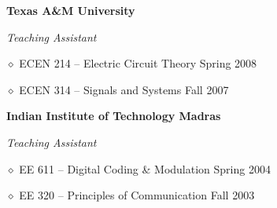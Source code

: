 \documentclass[11pt]{article}
\renewcommand{\section}[2]%
        {\pagebreak[2]\vspace{1.3\baselineskip}%
         \phantomsection\addcontentsline{toc}{section}{#1}%
         \hspace{0in}%
         \marginpar{
         \raggedright \scshape #1}#2}
\newenvironment{outerlist}[1][\enskip\textbullet]%
        {\begin{enumerate}[#1]}{\end{enumerate}%
         \vspace{-.6\baselineskip}}
\newenvironment{innerlist}[1][\enskip\textbullet]%
        {\begin{compactenum}[#1]}{\end{compactenum}}
\newcommand{\blankline}{\quad\pagebreak[2]}
\begin{document}
   \textbf{Texas A\&M University}\vspace{-.2cm}
\begin{outerlist}
\item[] \textit{Teaching Assistant}%
        \begin{innerlist}
\item[$\diamond$] {ECEN 214} -- Electric Circuit Theory  \hfill { Spring 2008}
\item[$\diamond$] {ECEN 314} -- Signals and Systems \hfill {Fall 2007}
\end{innerlist}
\end{outerlist}
\blankline     
   
   \textbf{Indian Institute of Technology Madras}\vspace{-.2cm}
\begin{outerlist}
\item[] \textit{Teaching Assistant}%
        \begin{innerlist}
   \item[$\diamond$] {EE 611} -- Digital Coding {\&} Modulation \hfill { Spring 2004}
   \item[$\diamond$] {EE 320} -- Principles of Communication \hfill { Fall 2003}
    \end{innerlist}

\end{outerlist}
\blankline   
      
   


%
\end{document}
